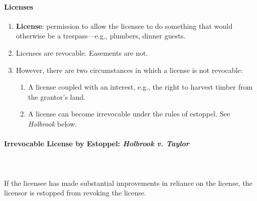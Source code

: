 \paragraph{Licenses}

\begin{enumerate}
    \item \textbf{License}: permission to allow the licensee to do something 
    that would otherwise be a trespass---e.g., plumbers, dinner guests.
    \item Licenses are revocable. Easements are not.
    \item However, there are two circumstances in which a license is not 
    revocable:
    \begin{enumerate}
        \item A license coupled with an interest, e.g., the right to harvest 
        timber from the grantor's land.
        \item A license can become irrevocable under the rules of estoppel. 
        See \emph{Holbrook} below.
    \end{enumerate}
\end{enumerate}

\paragraph{Irrevocable License by Estoppel: \emph{Holbrook v. Taylor}}
~\\\\
If the licensee has made substantial improvements in reliance on the license, 
the licensor is estopped from revoking the license.

